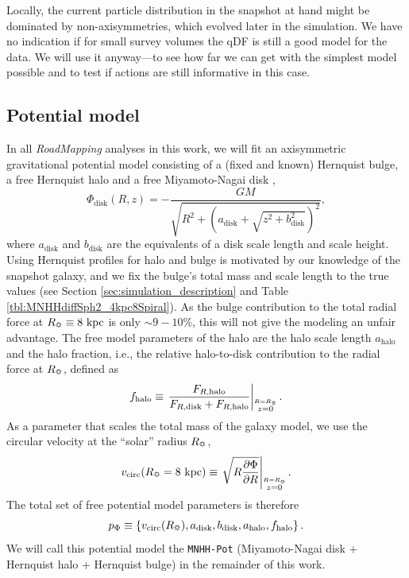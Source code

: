 \documentclass[iop,revtex4,numberedappendix,appendixfloats]{emulateapj}
\newcommand{\RM}{{\sl RoadMapping}}
\begin{document}
Locally, the current particle distribution in the snapshot at hand might be dominated by non-axisymmetries, which evolved later in the simulation. We have no indication if for small survey volumes the qDF is still a good model for the data. We will use it anyway---to see how far we can get with the simplest model possible and to test if actions are still informative in this case.

\subsection{Potential model} \label{sec:potential_model}

In all \RM{} analyses in this work, we will fit an axisymmetric gravitational potential model consisting of a (fixed and known) Hernquist bulge, a free Hernquist halo and a free Miyamoto-Nagai disk \citep{1975PASJ...27..533M},
\begin{equation}
\Phi_\text{disk}(R,z) = - \frac{GM}{\sqrt{R^2+(a_\text{disk}+\sqrt{z^2+b_\text{disk}^2})^2}}, \label{eq:MN-disk}
\end{equation}
where $a_\text{disk}$ and $b_\text{disk}$ are the equivalents of a disk scale length and scale height. Using Hernquist profiles for halo and bulge is motivated by our knowledge of the snapshot galaxy, and we fix the bulge's total mass and scale length to the true values (see Section \ref{sec:simulation_description} and Table \ref{tbl:MNHHdiffSph2_4kpc8Spiral}). As the bulge contribution to the total radial force at $R_\text{\sun}\equiv 8~\text{kpc}$ is only $\sim9-10\%$, this will not give the modeling an unfair advantage. The free model parameters of the halo are the halo scale length $a_\text{halo}$ and the halo fraction, i.e., the relative halo-to-disk contribution to the radial force at $R_\text{\sun}$, defined as
\begin{equation}
f_\text{halo} \equiv \left. \frac{F_{R,\text{halo}}}{F_{R,\text{disk}} + F_{R,\text{halo}}} \right|_{\stackrel{R=R_\text{\sun}}{z=0}}.\label{eq:fhalo}
\end{equation}
As a parameter that scales the total mass of the galaxy model, we use the circular velocity at the ``solar'' radius $R_\text{\sun}$,
\begin{equation}
v_\text{circ}(R_\text{\sun}=8~\text{kpc}) \equiv \left. \sqrt{ R \frac{\partial \Phi}{\partial R} }\right|_{\stackrel{R=R_\text{\sun}}{z=0}} . \label{eq:circvel}
\end{equation}
The total set of free potential model parameters is therefore
\begin{equation}
p_\Phi \equiv \left\{ v_\text{circ}(R_\text{\sun}),a_\text{disk},b_\text{disk},a_\text{halo},f_\text{halo}\right\}.
\end{equation} 
We will call this potential model the \texttt{MNHH-Pot} (Miyamoto-Nagai disk + Hernquist halo + Hernquist bulge) in the remainder of this work.
\end{document}
